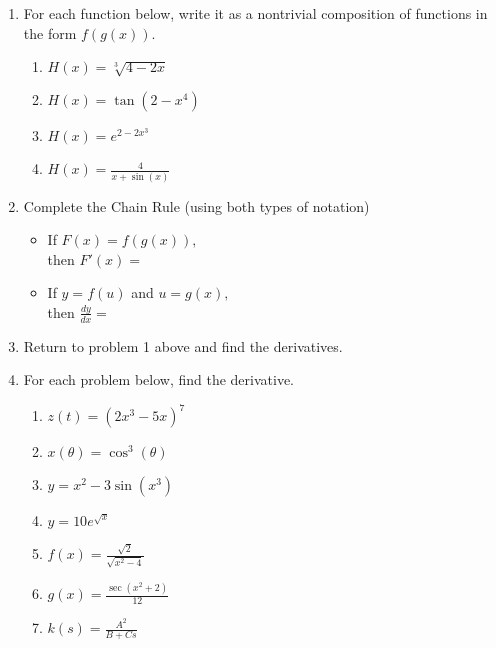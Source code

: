 \documentclass[11pt,fleqn]{article}
\begin{document}
\setlength{\parindent}{0cm}
\renewcommand{\headrulewidth}{0pt}
\newcommand{\blank}[1]{\rule{#1}{0.75pt}}
\renewcommand{\d}{\displaystyle}
\vspace*{-0.7in}
\begin{center}
 {\large{ }}
\end{center}
\begin{enumerate}
\item For each function below, write it as a nontrivial composition of functions in the form $f(g(x)).$
	\begin{enumerate}
	\item $\d{H(x)=\sqrt[3]{4-2x}}$
	\vfill
	\item $H(x)=\tan ( 2-x^4)$
	\vfill
	\item $H(x)=e^{2-2x^3}$
	\vfill
	\item $H(x)=\frac{4}{x+\sin (x)}$
	\vfill
	\end{enumerate}
\item Complete the Chain Rule (using both types of notation)
	\begin{multicols}{2}
	\begin{itemize}
	\item If $F(x)=f(g(x)),$\\ 
	
	then $F'(x)=$\\
	
	\item If $y=f(u)$ and $u=g(x),$\\ 
	
	then $\frac{dy}{dx}=$\\
	\end{itemize}
	\end{multicols}
\item Return to problem 1 above and find the derivatives.
\newpage
\item For each problem below, find the derivative.
	\begin{enumerate}
	\item $\d{z(t)=(2x^3-5x)^{7}}$
	\vfill
	\item $\d{x(\theta) = \cos^3(\theta)}$
	\vfill
	\item $\d{y=x^2-3\sin(x^3)}$
	\vfill
	\item $\d{y=10e^{\sqrt{x}}}$
	\vfill
	\item $\d{f(x)=\frac{\sqrt{2}}{\sqrt{x^2-4}}}$
	\vfill
	\item $\d{g(x)=\frac{\sec(x^2+2)}{12}}$
	\vfill
	\item $\d{k(s)=\frac{A^2}{B+Cs}}$
	\vfill
	\end{enumerate}
\end{enumerate}
\end{document}
